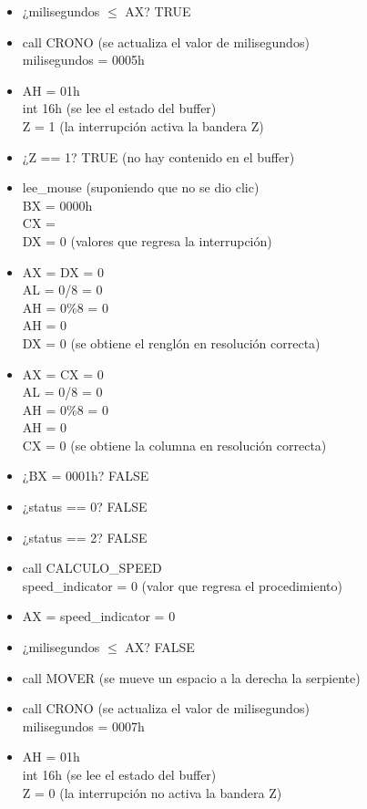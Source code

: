 \documentclass[12pt]{article}
\begin{document}
\begin{enumerate}
\begin{itemize}
        \item ¿milisegundos $\leq$ AX? TRUE
        \item call CRONO (se actualiza el valor de milisegundos) \\ milisegundos = 0005h
        \item AH = 01h \\ int 16h (se lee el estado del buffer) \\ Z = 1 (la interrupción activa la bandera Z)
        \item ¿Z == 1? TRUE (no hay contenido en el buffer)
        \item lee\_mouse (suponiendo que no se dio clic) \\ BX = 0000h\\ CX =  \\ DX = 0 (valores que regresa la interrupción)
        \item AX = DX = 0 \\ AL = 0/8 = 0 \\ AH = 0\%8 = 0 \\ AH = 0 \\DX = 0 (se obtiene el renglón en resolución correcta)
        \item AX = CX = 0 \\ AL = 0/8 = 0 \\ AH = 0\%8 = 0 \\ AH = 0 \\CX = 0 (se obtiene la columna en resolución correcta)
        \item ¿BX = 0001h? FALSE 
        \item ¿status == 0? FALSE
        \item ¿status == 2? FALSE
        \item call CALCULO\_SPEED \\ speed\_indicator = 0 (valor que regresa el procedimiento)
        \item AX = speed\_indicator = 0
        \item ¿milisegundos $\leq$ AX? FALSE
        \item call MOVER (se mueve un espacio a la derecha la serpiente)
        \item call CRONO (se actualiza el valor de milisegundos) \\ milisegundos = 0007h
        \item AH = 01h \\ int 16h (se lee el estado del buffer) \\ Z = 0 (la interrupción no activa la bandera Z)

\end{itemize}
\end{enumerate}
\end{document}
